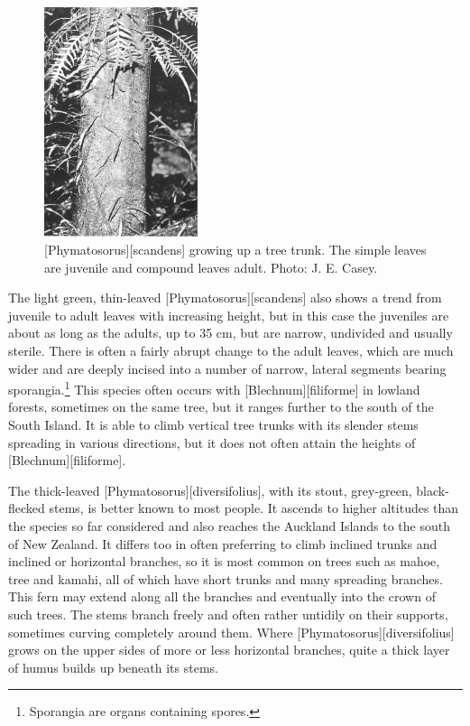 \begin{figure}
	\includegraphics[width=0.4\textwidth]{graphics/figure29scandens.jpg}
	\centering
	\caption[\emph{Phymatosorus scandens} growing up a tree trunk]{[Phymatosorus][scandens] growing up a tree trunk.
The simple leaves are juvenile and compound leaves adult.
	Photo: J. E. Casey.}%
	\label{fig:29scandens}
\end{figure}

The light green, thin-leaved [Phymatosorus][scandens] also shows a trend from juvenile to adult leaves with increasing height, but in this case the juveniles are about as long as the adults, up to 35 cm, but are narrow, undivided and usually sterile.
There is often a fairly abrupt change to the adult leaves, which are much wider and are deeply incised into a number of narrow, lateral segments bearing sporangia.\footnote{Sporangia are organs containing spores.}
This species often occurs with [Blechnum][filiforme] in lowland forests, sometimes on the same tree, but it ranges further to the south of the South Island.
It is able to climb vertical tree trunks with its slender stems spreading in various directions, but it does not often attain the heights of [Blechnum][filiforme].

The thick-leaved [Phymatosorus][diversifolius], with its stout, grey-green, black-flecked stems, is better known to most people.
It ascends to higher altitudes than the species so far considered and also reaches the Auckland Islands to the south of New Zealand.
It differs too in often preferring to climb inclined trunks and inclined or horizontal branches, so it is most common on trees such as mahoe, tree  and kamahi, all of which have short trunks and many spreading branches.
This fern may extend along all the branches and eventually into the crown of such trees.
The stems branch freely and often rather untidily on their supports, sometimes curving completely around them.
Where [Phymatosorus][diversifolius] grows on the upper sides of more or less horizontal branches, quite a thick layer of humus builds up beneath its stems.

